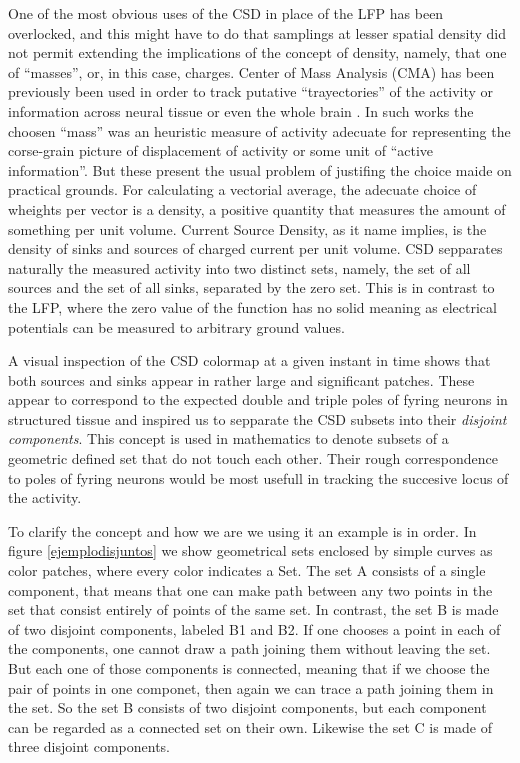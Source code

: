 \documentclass{article}
\begin{document}
One of the most obvious uses of the CSD in place of the LFP has been overlocked, and this might have to do that samplings at lesser spatial density did not permit extending the implications of the concept of density, namely, that one of ``masses'', or, in this case, charges. Center of Mass Analysis (CMA) has been previously been used in order to track putative ``trayectories'' of the activity or information across neural tissue or even the whole brain \cite{Chao05, Manjarrez07}. In such works the choosen ``mass'' was an heuristic measure of activity adecuate for representing the corse-grain picture of displacement of activity or some unit of ``active information''. But these present the usual problem of justifing the choice maide on practical grounds. For calculating a vectorial average, the adecuate choice of wheights per vector is a density, a positive quantity that measures the amount of something per unit volume. Current Source Density, as it name implies, is the density of sinks and sources of charged current per unit volume. CSD sepparates naturally the measured activity into two distinct sets, namely, the set of all sources and the set of all sinks, separated by the zero set. This is in contrast to the LFP, where the zero value of the function has no solid meaning as electrical potentials can be measured to arbitrary ground values.

A visual inspection of the CSD colormap at a given instant in time shows that both sources and sinks appear in rather large and significant patches. These appear to correspond to the expected double and triple poles of fyring neurons in structured tissue \cite{} and inspired us to sepparate the CSD subsets into their \emph{disjoint components}. This concept is used in mathematics to denote subsets of a geometric defined set that do not touch each other. Their rough correspondence to poles of fyring neurons would be most usefull in tracking the succesive locus of the activity.

To clarify the concept and how we are we using it an example is in order. In figure \ref{ejemplodisjuntos} we show geometrical sets enclosed by simple curves as color patches, where every color indicates a Set. The set A consists of a single component, that means that one can make  path between any two points in the set that consist entirely of points of the same set. In contrast, the set B is made of two disjoint components, labeled B1 and B2. If one chooses a point in each of the components, one cannot draw a path joining them without leaving the set. But each one of those components is connected, meaning that if we choose the pair of points in one componet, then again we can trace a path joining them in the set. So the set B consists of two disjoint components, but each component can be regarded as a connected set on their own. Likewise the set C is made of three disjoint components. 
\end{document}
